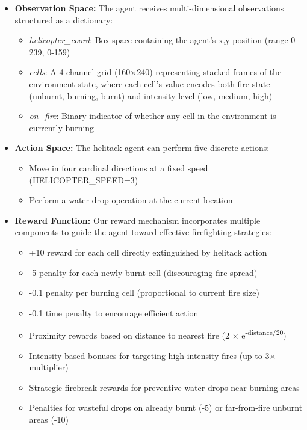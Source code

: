 \documentclass[conference]{IEEEtran}
\begin{document}
\begin{itemize}
    \item \textbf{Observation Space:} The agent receives multi-dimensional observations structured as a dictionary:
    \begin{itemize}
        \item \textit{helicopter\_coord}: Box space containing the agent's x,y position (range 0-239, 0-159)
        \item \textit{cells}: A 4-channel grid (160×240) representing stacked frames of the environment state, where each cell's value encodes both fire state (unburnt, burning, burnt) and intensity level (low, medium, high)
        \item \textit{on\_fire}: Binary indicator of whether any cell in the environment is currently burning
    \end{itemize}
    
    \item \textbf{Action Space:} The helitack agent can perform five discrete actions:
    \begin{itemize}
        \item Move in four cardinal directions at a fixed speed (HELICOPTER\_SPEED=3)
        \item Perform a water drop operation at the current location
    \end{itemize}
    
    \item \textbf{Reward Function:} Our reward mechanism incorporates multiple components to guide the agent toward effective firefighting strategies:
    \begin{itemize}
        \item +10 reward for each cell directly extinguished by helitack action
        \item -5 penalty for each newly burnt cell (discouraging fire spread)
        \item -0.1 penalty per burning cell (proportional to current fire size)
        \item -0.1 time penalty to encourage efficient action
        \item Proximity rewards based on distance to nearest fire (2 × e\textsuperscript{-distance/20})
        \item Intensity-based bonuses for targeting high-intensity fires (up to 3× multiplier)
        \item Strategic firebreak rewards for preventive water drops near burning areas
        \item Penalties for wasteful drops on already burnt (-5) or far-from-fire unburnt areas (-10)
    \end{itemize}
    

\end{itemize}
\end{document}
